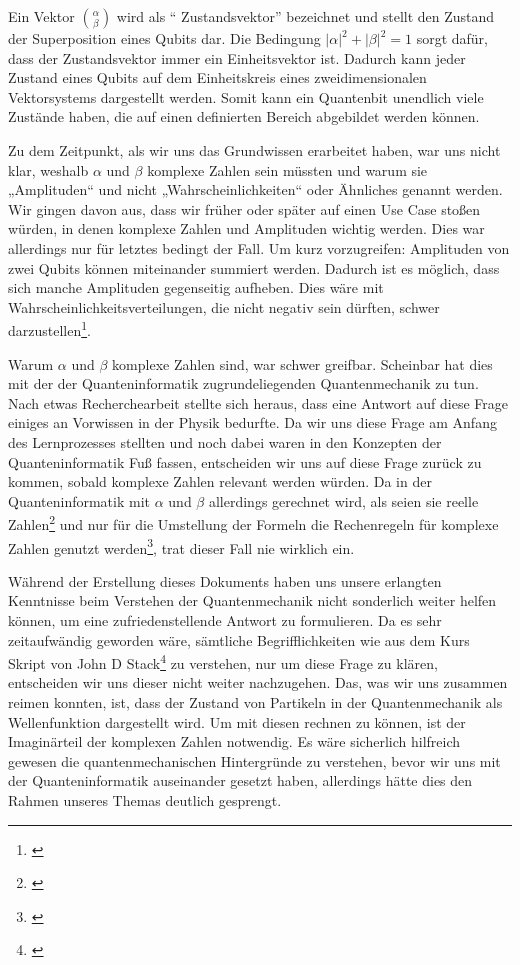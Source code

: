 Ein Vektor $\binom{\alpha}{\beta}$ wird als ``
Zustandsvektor'' bezeichnet und stellt den Zustand der Superposition eines Qubits dar. Die Bedingung $\left|\alpha\right|^2+\left|\beta\right|^2=1$ sorgt dafür, dass der Zustandsvektor immer ein Einheitsvektor ist. Dadurch kann jeder Zustand eines Qubits auf dem Einheitskreis eines zweidimensionalen Vektorsystems dargestellt werden. Somit kann ein Quantenbit unendlich viele Zustände haben, die auf einen definierten Bereich abgebildet werden können. 

\begin{tcolorbox}[title=Kommentar,
    title filled=false,
    colback=cyan!5!white,
    colframe=cyan!75!black]
Zu dem Zeitpunkt, als wir uns das Grundwissen erarbeitet haben, war uns nicht klar, weshalb $\alpha$ und $\beta$ komplexe Zahlen sein müssten und warum sie „Amplituden“ und nicht „Wahrscheinlichkeiten“ oder Ähnliches genannt werden. Wir gingen davon aus, dass wir früher oder später auf einen Use Case stoßen würden, in denen komplexe Zahlen und Amplituden wichtig werden. Dies war allerdings nur für letztes bedingt der Fall. Um kurz vorzugreifen: Amplituden von zwei Qubits können miteinander summiert werden. Dadurch ist es möglich, dass sich manche Amplituden gegenseitig aufheben. Dies wäre mit Wahrscheinlichkeitsverteilungen, die nicht negativ sein dürften, schwer darzustellen\footnote{\cite{homeister_quantum_2022}}.

Warum $\alpha$ und $\beta$ komplexe Zahlen sind, war schwer greifbar. Scheinbar hat dies mit der der Quanteninformatik zugrundeliegenden Quantenmechanik zu tun. Nach etwas Recherchearbeit stellte sich heraus, dass eine Antwort auf diese Frage einiges an Vorwissen in der Physik bedurfte. Da wir uns diese Frage am Anfang des Lernprozesses stellten und noch dabei waren in den Konzepten der Quanteninformatik Fuß fassen, entscheiden wir uns auf diese Frage zurück zu kommen, sobald komplexe Zahlen relevant werden würden. Da in der Quanteninformatik mit $\alpha$ und $\beta$ allerdings gerechnet wird, als seien sie reelle Zahlen\footnote{\cite{why_complex_numbers}} und nur für die Umstellung der Formeln die Rechenregeln für komplexe Zahlen genutzt werden\footnote{\cite{homeister_quantum_2022}}, trat dieser Fall nie wirklich ein.

Während der Erstellung dieses Dokuments haben uns unsere erlangten Kenntnisse beim Verstehen der Quantenmechanik nicht sonderlich weiter helfen können, um eine zufriedenstellende Antwort zu formulieren. Da es sehr zeitaufwändig geworden wäre, sämtliche Begrifflichkeiten wie aus dem Kurs Skript von John D Stack\footnote{\cite{no_title}} zu verstehen, nur um diese Frage zu klären, entscheiden wir uns dieser nicht weiter nachzugehen. Das, was wir uns zusammen reimen konnten, ist, dass der Zustand von Partikeln in der Quantenmechanik als Wellenfunktion dargestellt wird. Um mit diesen rechnen zu können, ist der Imaginärteil der komplexen Zahlen notwendig. Es wäre sicherlich hilfreich gewesen die quantenmechanischen Hintergründe zu verstehen, bevor wir uns mit der Quanteninformatik auseinander gesetzt haben, allerdings hätte dies den Rahmen unseres Themas deutlich gesprengt.
\end{tcolorbox}

